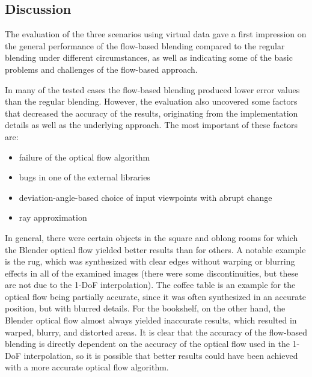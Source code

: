 \subsection{Discussion} \label{subsec:discussion_virtual}
The evaluation of the three scenarios using virtual data gave a first impression on the general performance of the flow-based blending compared to the regular blending under different circumstances, as well as indicating some of the basic problems and challenges of the flow-based approach.


In many of the tested cases the flow-based blending produced lower error values than the regular blending. However, the evaluation also uncovered some factors that decreased the accuracy of the results, originating from the implementation details as well as the underlying approach. The most important of these factors are:

\begin{itemize}
  \item failure of the optical flow algorithm
  \item bugs in one of the external libraries
  \item deviation-angle-based choice of input viewpoints with abrupt change
  \item ray approximation
\end{itemize}


In general, there were certain objects in the square and oblong rooms for which the Blender optical flow yielded better results than for others. A notable example is the rug, which was synthesized with clear edges without warping or blurring effects in all of the examined images (there were some discontinuities, but these are not due to the 1-DoF interpolation). The coffee table is an example for the optical flow being partially accurate, since it was often synthesized in an accurate position, but with blurred details. For the bookshelf, on the other hand, the Blender optical flow almost always yielded inaccurate results, which resulted in warped, blurry, and distorted areas. It is clear that the accuracy of the flow-based blending is directly dependent on the accuracy of the optical flow used in the 1-DoF interpolation, so it is possible that better results could have been achieved with a more accurate optical flow algorithm.

